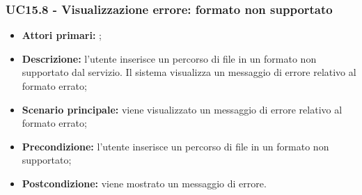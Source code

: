 \subsubsection{UC15.8 - Visualizzazione errore: formato non supportato}
\begin{itemize}
	\item \textbf{Attori primari:} \us{};
	\item \textbf{Descrizione:} l’utente inserisce un percorso di file in un formato non supportato dal servizio. Il sistema visualizza un messaggio di errore relativo al formato errato;
	\item \textbf{Scenario principale:} viene visualizzato un messaggio di errore relativo al formato errato;
	\item \textbf{Precondizione:} l'utente inserisce un percorso di file in un formato non supportato;
	\item \textbf{Postcondizione:} viene mostrato un messaggio di errore. 
\end{itemize}
